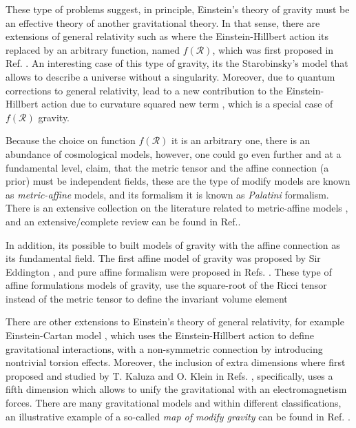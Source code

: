 \documentclass{article}
\begin{document}
These type of problems suggest, in principle, Einstein's theory of gravity must be an effective theory of another gravitational theory. In that sense, 
there are extensions of general relativity such as where the Einstein-Hillbert action its replaced by an arbitrary function, named $f(\mathcal{R})$, 
which was first proposed in Ref. \cite{10.1093/mnras/150.1.1}. An interesting case of this type of gravity, its the Starobinsky's model \cite{STAROBINSKY198099} 
that allows to describe a universe without a singularity. Moreover, due to quantum corrections to general relativity, lead to a new contribution 
to the Einstein-Hillbert action due to curvature squared new term \cite{1979ZhPmR..30..719S}, which is a special case of $f(\mathcal{R})$ gravity. 

Because the choice on function $f(\mathcal{R})$ it is an arbitrary one, there is an abundance of cosmological models, however, one could go even 
further and at a fundamental level, claim, that the metric tensor and the affine connection (a prior) must be independent fields, these are 
the type of modify models are known as \textit{metric-affine} models, and its formalism it is known as \textit{Palatini} formalism. There is an 
extensive collection on the literature related to metric-affine models \cite{Hehl_1995,Baldazzi_2022,Vitagliano_2011,Karahan_2012,SARDANASHVILY_2011}, and 
an extensive/complete review can be found in Ref.\cite{OLMO_2011}.

In addition, its possible to built models of gravity with the affine connection as its fundamental field. The first affine model of gravity was proposed by
Sir Eddington \cite{Eddington1923-EDDTMT}, and pure affine formalism were proposed in Refs. \cite{Krasnov_2011,poplawski2007unified,POP_AWSKI_2007}. 
These type of affine formulations models of gravity, use the square-root of the Ricci tensor instead of the metric tensor to define the invariant volume element

There are other extensions to Einstein's theory of general relativity, for example Einstein-Cartan model \cite{ASENS_1924_3_41__1_0,ASENS_1925_3_42__17_0}, 
which uses the Einstein-Hillbert action to define gravitational interactions, with a non-symmetric connection by introducing nontrivial 
torsion effects. Moreover, the inclusion of extra dimensions where first proposed and studied by T. Kaluza and O. 
Klein in Refs. \cite{Kaluza_Klein}, specifically, uses a fifth dimension which allows to unify the gravitational with an 
electromagnetism forces. There are many gravitational models and within different classifications, an illustrative example 
of a so-called \textit{map of modify gravity} can be found in Ref. \cite{Shankaranarayanan_2022}.
\end{document}
